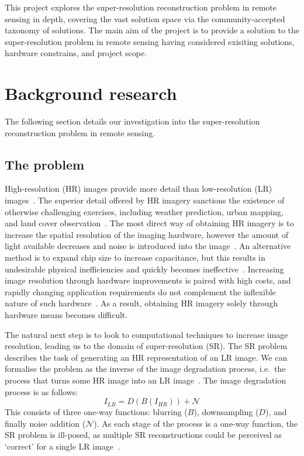 This project explores the super-resolution reconstruction problem in remote sensing in depth, covering the vast solution space via the community-accepted taxonomy of solutions. The main aim of the project is to provide a solution to the super-resolution problem in remote sensing having considered exisiting solutions, hardware constrains, and project scope.
\clearpage
\section{Background research}\label{sec:background_research}
The following section details our investigation into the super-resolution reconstruction problem in remote sensing.

\subsection{The problem}\label{subsec:the_problem}
High-resolution (HR) images provide more detail than low-resolution (LR) images~\cite{urbanMapping}. The superior detail offered by HR imagery sanctions the existence of otherwise challenging exercises, including weather prediction, urban mapping, and land cover observation~\cite{urbanMapping, mapping, cloudCover, vegetationMapping}. The most direct way of obtaining HR imagery is to increase the spatial resolution of the imaging hardware, however the amount of light available decreases and noise is introduced into the image~\cite{superResOverview}. An alternative method is to expand chip size to increase capacitance, but this results in undesirable physical inefficiencies and quickly becomes ineffective~\cite{superResOverview}. Increasing image resolution through hardware improvements is paired with high costs, and rapidly changing application requirements do not complement the inflexible nature of such hardware~\cite{remoteSensingGANsReview}. As a result, obtaining HR imagery solely through hardware means becomes difficult.

The natural next step is to look to computational techniques to increase image resolution, leading us to the domain of super-resolution (SR). The SR problem describes the task of generating an HR representation of an LR image. We can formalise the problem as the inverse of the image degradation process, i.e.\ the process that turns some HR image into an LR image~\cite{imageDeg}. The image degradation process is as follows:
\begin{equation}\label{eq:image_deg}
    I_{LR} = D(B(I_{HR})) + \mathcal{N}
\end{equation}
This consists of three one-way functions: blurring ($B$), downsampling ($D$), and finally noise addition ($\mathcal{N}$). As each stage of the process is a one-way function, the SR problem is ill-posed, as multiple SR reconstructions could be perceived as `correct' for a single LR image~\cite{remoteSensingDeepLearningReview}.

